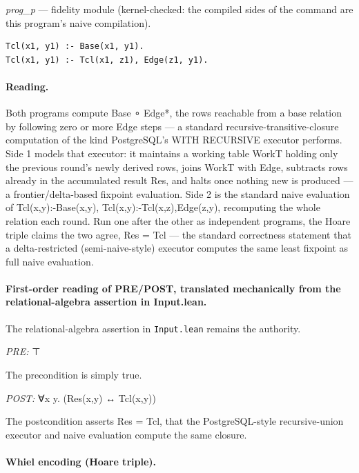 \documentclass[10pt]{article}
\begin{document}
{\raggedright\textit{prog\_p} --- fidelity module (kernel-checked: the compiled sides of the command are this program's naive compilation).\par}

\begin{Verbatim}[fontsize=\scriptsize,breaklines=true,breakanywhere=true,frame=single,framesep=1.5mm]
Tcl(x1, y1) :- Base(x1, y1).
Tcl(x1, y1) :- Tcl(x1, z1), Edge(z1, y1).
\end{Verbatim}

\paragraph{Reading.} Both programs compute Base ∘ Edge*, the rows reachable from a base relation by following zero or more Edge steps --- a standard recursive-transitive-closure computation of the kind PostgreSQL's WITH RECURSIVE executor performs. Side 1 models that executor: it maintains a working table WorkT holding only the previous round's newly derived rows, joins WorkT with Edge, subtracts rows already in the accumulated result Res, and halts once nothing new is produced --- a frontier/delta-based fixpoint evaluation. Side 2 is the standard naive evaluation of Tcl(x,y):-Base(x,y), Tcl(x,y):-Tcl(x,z),Edge(z,y), recomputing the whole relation each round. Run one after the other as independent programs, the Hoare triple claims the two agree, Res = Tcl --- the standard correctness statement that a delta-restricted (semi-naive-style) executor computes the same least fixpoint as full naive evaluation.

\paragraph{First-order reading of PRE/POST, translated mechanically from the relational-algebra assertion in Input.lean.} The relational-algebra assertion in \texttt{Input.lean} remains the authority.

\textit{PRE:} ⊤\par The precondition is simply true.

\textit{POST:} ∀x y. (Res(x,y) ↔ Tcl(x,y))\par The postcondition asserts Res = Tcl, that the PostgreSQL-style recursive-union executor and naive evaluation compute the same closure.

\paragraph{Whiel encoding (Hoare triple).}
\end{document}
